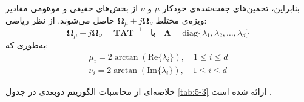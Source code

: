 بنابراین، تخمین‌های جفت‌شده‌ی خودکار $\mu$ و $\nu$ از بخش‌های حقیقی و موهومی مقادیر ویژه‌ی مختلط $\bm{\Omega}_{\mu} + j \bm{\Omega}_{\nu}$ حاصل می‌شوند. از نظر ریاضی:
\begin{equation}
	\bm{\Omega}_{\mu} + j \bm{\Omega}_{\nu} = \bm{T} \bm{\Lambda} \bm{T}^{-1} \quad \text{با} \quad \bm{\Lambda} = \text{diag}\{\lambda_1, \lambda_2, \dots, \lambda_d\}
	\label{eq:5-67}
\end{equation}
به‌طوری که:
\begin{subequations}
	\begin{gather}
		\mu_i = 2 \arctan(\text{Re}\{\lambda_i\}), \quad 1 \leq i \leq d \label{eq:5-68a} \\
		\nu_i = 2 \arctan(\text{Im}\{\lambda_i\}), \quad 1 \leq i \leq d \label{eq:5-68b}
	\end{gather}
	\label{eq:5-68}
\end{subequations}

خلاصه‌ای از محاسبات الگوریتم  دوبعدی در جدول \ref{tab:5-3} ارائه شده است \cite{5-1}.


